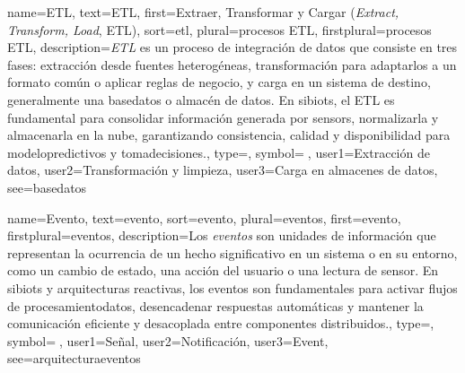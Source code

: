 	
	{
		name={ETL},
		text={ETL},
		first={Extraer, Transformar y Cargar (\textit{Extract, Transform, Load}, ETL)},
		sort={etl},
		plural={procesos ETL},
		firstplural={procesos ETL},
		description={\emph{ETL} es un proceso de integraci{\'o}n de \glspl{dato} que consiste en tres fases: extracci{\'o}n desde fuentes heterog{\'e}neas, transformaci{\'o}n para adaptarlos a un formato com{\'u}n o aplicar reglas de negocio, y carga en un sistema de destino, generalmente una \gls{basedatos} o almac{\'e}n de datos. En \glspl{sibiot}, el ETL es fundamental para consolidar informaci{\'o}n generada por \glspl{sensor}, normalizarla y almacenarla en la \gls{nube}, garantizando \gls{consistencia}, \gls{calidad} y disponibilidad para \glspl{modelopredictivo} y \gls{tomadecisiones}.},
		type=\glsdefaulttype,
		symbol={🔄},
		user1={Extracci{\'o}n de datos},
		user2={Transformaci{\'o}n y limpieza},
		user3={Carga en almacenes de datos},
		see={basedatos}
	}
	
	{
		name={Evento},
		text={evento},
		sort={evento},
		plural={eventos},
		first={evento},
		firstplural={eventos},
		description={Los \emph{eventos} son unidades de informaci{\'o}n que representan la ocurrencia de un hecho significativo en un \gls{sistema} o en su \gls{entorno}, como un cambio de estado, una acci{\'o}n del usuario o una lectura de \gls{sensor}. En \glspl{sibiot} y arquitecturas reactivas, los eventos son fundamentales para activar flujos de \gls{procesamientodatos}, desencadenar respuestas autom{\'a}ticas y mantener la comunicaci{\'o}n eficiente y desacoplada entre componentes distribuidos.},
		type=\glsdefaulttype,
		symbol={📢},
		user1={Se{\~n}al},
		user2={Notificaci{\'o}n},
		user3={Event},
		see={arquitecturaeventos}
	}
		
